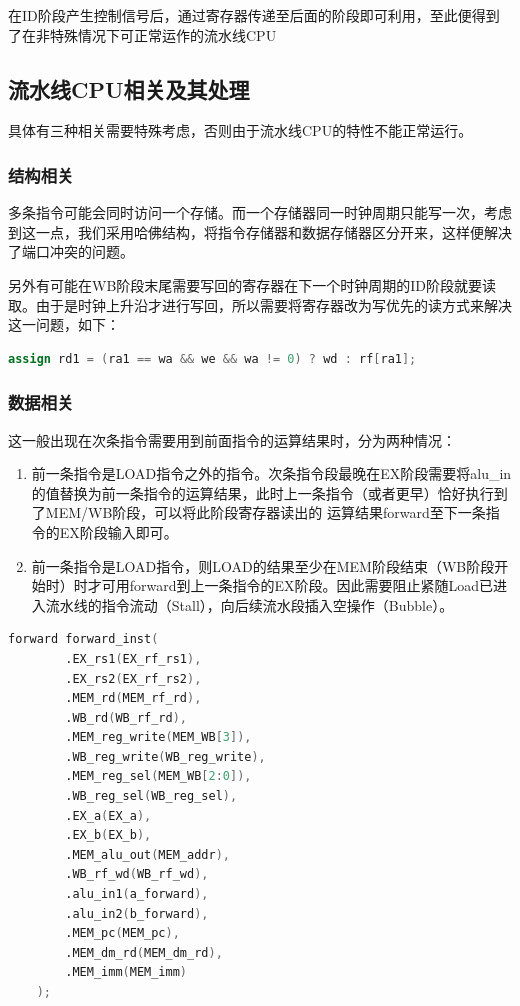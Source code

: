\documentclass[a4paper]{article}
\begin{document}
在ID阶段产生控制信号后，通过寄存器传递至后面的阶段即可利用，至此便得到了在非特殊情况下可正常运作的流水线CPU


\subsection{流水线CPU相关及其处理}
具体有三种相关需要特殊考虑，否则由于流水线CPU的特性不能正常运行。
\subsubsection{结构相关}
多条指令可能会同时访问一个存储。而一个存储器同一时钟周期只能写一次，考虑到这一点，我们采用哈佛结构，将指令存储器和数据存储器区分开来，这样便解决了端口冲突的问题。

另外有可能在WB阶段末尾需要写回的寄存器在下一个时钟周期的ID阶段就要读取。由于是时钟上升沿才进行写回，所以需要将寄存器改为写优先的读方式来解决这一问题，如下：
\begin{lstlisting}[language={verilog},title={cpu.v}] 
    assign rd1 = (ra1 == wa && we && wa != 0) ? wd : rf[ra1];  
\end{lstlisting}

\subsubsection{数据相关}
这一般出现在次条指令需要用到前面指令的运算结果时，分为两种情况：
\begin{enumerate}
    \item 前一条指令是LOAD指令之外的指令。次条指令段最晚在EX阶段需要将alu\_in的值替换为前一条指令的运算结果，此时上一条指令（或者更早）恰好执行到了MEM/WB阶段，可以将此阶段寄存器读出的
    运算结果forward至下一条指令的EX阶段输入即可。
    \item 前一条指令是LOAD指令，则LOAD的结果至少在MEM阶段结束（WB阶段开始时）时才可用forward到上一条指令的EX阶段。因此需要阻止紧随Load已进入流水线的指令流动（Stall），向后续流水段插入空操作（Bubble）。
\end{enumerate}
\begin{lstlisting}[language={verilog},title={cpu.v}] 
    forward forward_inst(
        .EX_rs1(EX_rf_rs1),
        .EX_rs2(EX_rf_rs2),
        .MEM_rd(MEM_rf_rd),
        .WB_rd(WB_rf_rd),
        .MEM_reg_write(MEM_WB[3]),
        .WB_reg_write(WB_reg_write),
        .MEM_reg_sel(MEM_WB[2:0]),
        .WB_reg_sel(WB_reg_sel),
        .EX_a(EX_a),
        .EX_b(EX_b),
        .MEM_alu_out(MEM_addr),
        .WB_rf_wd(WB_rf_wd),
        .alu_in1(a_forward),
        .alu_in2(b_forward),
        .MEM_pc(MEM_pc),
        .MEM_dm_rd(MEM_dm_rd),
        .MEM_imm(MEM_imm)
    );
\end{lstlisting}
\end{document}
